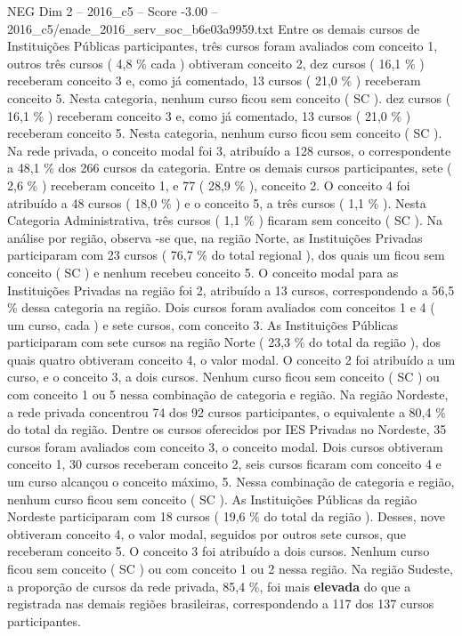 \begin{textsample}{NEG Dim 2 – 2016\_c5 – Score -3.00 – 2016\_c5/enade\_2016\_serv\_soc\_b6e03a9959.txt}
Entre os demais cursos de Instituições Públicas participantes, três cursos foram avaliados com conceito 1, outros três cursos ( 4,8 \% cada ) obtiveram conceito 2, dez cursos ( 16,1 \% ) receberam conceito 3 e, como já comentado, 13 cursos ( 21,0 \% ) receberam conceito 5.
Nesta categoria, nenhum curso ficou sem conceito ( SC ). dez cursos ( 16,1 \% ) receberam conceito 3 e, como já comentado, 13 cursos ( 21,0 \% ) receberam conceito 5.
Nesta categoria, nenhum curso ficou sem conceito ( SC ).
Na rede privada, o conceito modal foi 3, atribuído a 128 cursos, o correspondente a 48,1 \% dos 266 cursos da categoria.
Entre os demais cursos participantes, sete ( 2,6 \% ) receberam conceito 1, e 77 ( 28,9 \% ), conceito 2.
O conceito 4 foi atribuído a 48 cursos ( 18,0 \% ) e o conceito 5, a três cursos ( 1,1 \% ).
Nesta Categoria Administrativa, três cursos ( 1,1 \% ) ficaram sem conceito ( SC ).
Na análise por região, observa -se que, na região Norte, as Instituições Privadas participaram com 23 cursos ( 76,7 \% do total regional ), dos quais um ficou sem conceito ( SC ) e nenhum recebeu conceito 5.
O conceito modal para as Instituições Privadas na região foi 2, atribuído a 13 cursos, correspondendo a 56,5 \% dessa categoria na região.
Dois cursos foram avaliados com conceitos 1 e 4 ( um curso, cada ) e sete cursos, com conceito 3.
As Instituições Públicas participaram com sete cursos na região Norte ( 23,3 \% do total da região ), dos quais quatro obtiveram conceito 4, o valor modal.
O conceito 2 foi atribuído a um curso, e o conceito 3, a dois cursos.
Nenhum curso ficou sem conceito ( SC ) ou com conceito 1 ou 5 nessa combinação de categoria e região.
Na região Nordeste, a rede privada concentrou 74 dos 92 cursos participantes, o equivalente a 80,4 \% do total da região.
Dentre os cursos oferecidos por IES Privadas no Nordeste, 35 cursos foram avaliados com conceito 3, o conceito modal.
Dois cursos obtiveram conceito 1, 30 cursos receberam conceito 2, seis cursos ficaram com conceito 4 e um curso alcançou o conceito máximo, 5.
Nessa combinação de categoria e região, nenhum curso ficou sem conceito ( SC ).
As Instituições Públicas da região Nordeste participaram com 18 cursos ( 19,6 \% do total da região ).
Desses, nove obtiveram conceito 4, o valor modal, seguidos por outros sete cursos, que receberam conceito 5.
O conceito 3 foi atribuído a dois cursos.
Nenhum curso ficou sem conceito ( SC ) ou com conceito 1 ou 2 nessa região.
Na região Sudeste, a proporção de cursos da rede privada, 85,4 \%, foi mais \textbf{elevada} do que a registrada nas demais regiões brasileiras, correspondendo a 117 dos 137 cursos participantes.

\end{textsample}
